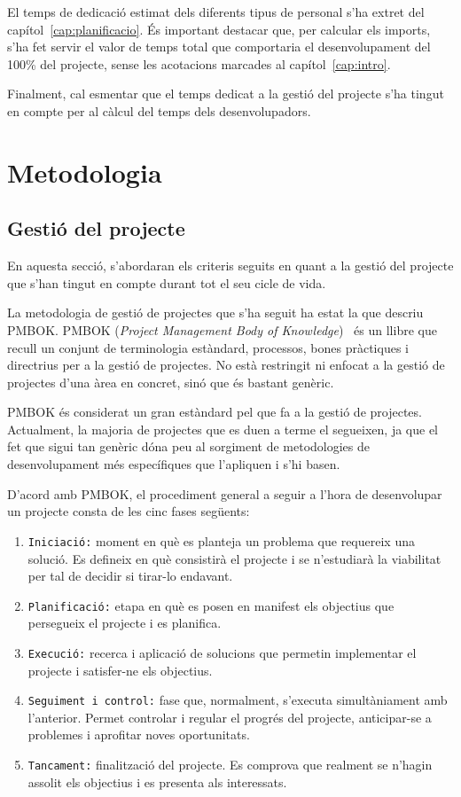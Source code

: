 \documentclass[a4paper,12pt]{ThesisStyle}
\begin{document}
El temps de dedicació estimat dels diferents tipus de personal s'ha extret del capítol~\ref{cap:planificacio}. És important destacar que, per calcular els imports, s'ha fet servir el valor de temps total que comportaria el desenvolupament del 100\% del projecte, sense les acotacions marcades al capítol~\ref{cap:intro}.

Finalment, cal esmentar que el temps dedicat a la gestió del projecte s'ha tingut en compte per al càlcul del temps dels desenvolupadors.


\chapter{Metodologia}
\label{cap:metodologia}

\section{Gestió del projecte}
\label{sec:gestio_projecte}

En aquesta secció, s'abordaran els criteris seguits en quant a la gestió del projecte que s'han tingut en compte durant tot el seu cicle de vida.

La metodologia de gestió de projectes que s'ha seguit ha estat la que descriu PMBOK. PMBOK (\textit{Project Management Body of Knowledge})~\cite{PMBOK} és un llibre que recull un conjunt de terminologia estàndard, processos, bones pràctiques i directrius per a la gestió de projectes. No està restringit ni enfocat a la gestió de projectes d'una àrea en concret, sinó que és bastant genèric.

PMBOK és considerat un gran estàndard pel que fa a la gestió de projectes. Actualment, la majoria de projectes que es duen a terme el segueixen, ja que el fet que sigui tan genèric dóna peu al sorgiment de metodologies de desenvolupament més específiques que l'apliquen i s'hi basen.

D'acord amb PMBOK, el procediment general a seguir a l'hora de desenvolupar un projecte consta de les cinc fases següents:
\begin{enumerate}
  \item \texttt{Iniciació:} moment en què es planteja un problema que requereix una solució. Es defineix en què consistirà el projecte i se n'estudiarà la viabilitat per tal de decidir si tirar-lo endavant.
  \item \texttt{Planificació:} etapa en què es posen en manifest els objectius que persegueix el projecte i es planifica.
  \item \texttt{Execució:} recerca i aplicació de solucions que permetin implementar el projecte i satisfer-ne els objectius.
  \item \texttt{Seguiment i control:} fase que, normalment, s'executa simultàniament amb l'anterior. Permet controlar i regular el progrés del projecte, anticipar-se a problemes i aprofitar noves oportunitats.
  \item \texttt{Tancament:} finalització del projecte. Es comprova que realment se n'hagin assolit els objectius i es presenta als interessats.
\end{enumerate}
\end{document}
